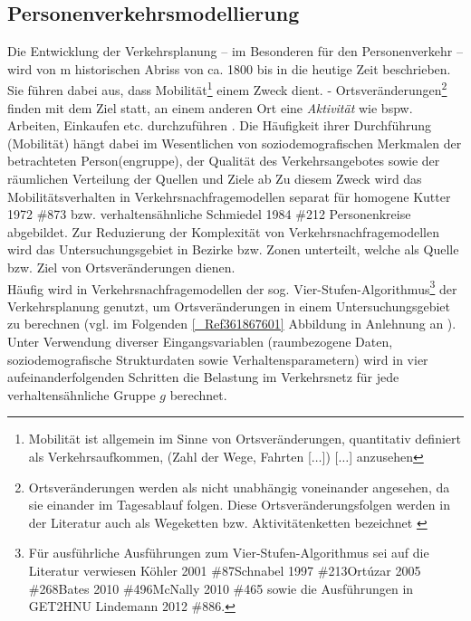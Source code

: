 % 
\subsection{Personenverkehrsmodellierung}
\label{_Ref364762824}
\label{_Toc365801592}
\label{_Toc366766082}
\label{_Toc366775276}
\label{_CTVC001a03b396d789f4a13bc4cb685af8db7c9}
Die Entwicklung der Verkehrsplanung – im Besonderen für den Personenverkehr – wird von  \citeauthor{bib.885} m historischen Abriss von ca. 1800 bis in die heutige Zeit beschrieben. Sie führen dabei aus, dass Mobilität\footnote{%
 Mobilität ist \glqq allgemein im Sinne von Ortsveränderungen, quantitativ definiert als Verkehrsaufkommen, (Zahl der Wege, Fahrten [$\ldots$]) [$\ldots$] anzusehen\grqq   \autocites[][]{bib.885}
}%
 einem Zweck dient. - Ortsveränderungen\footnote{%
 Ortsveränderungen werden als nicht unabhängig voneinander angesehen, da sie einander im Tagesablauf folgen. Diese Ortsveränderungsfolgen werden in der Literatur auch als Wegeketten bzw. Aktivitätenketten bezeichnet  \autocites[][]{bib.213}
}%
 finden mit dem Ziel statt, an einem anderen Ort eine \emph{Aktivität} wie bspw. Arbeiten, Einkaufen etc. durchzuführen  \autocites[vgl.][8ff]{bib.885}. Die Häufigkeit ihrer Durchführung (Mobilität) hängt dabei im Wesentlichen von soziodemografischen Merkmalen der betrachteten Person(engruppe), der Qualität des Verkehrsangebotes sowie der räumlichen Verteilung der Quellen und Ziele ab  \autocites[][]{bib.213} Zu diesem Zweck wird das Mobilitätsverhalten in Verkehrsnachfragemodellen separat für homogene {Kutter 1972 \#873} bzw. verhaltensähnliche {Schmiedel 1984 \#212} Personenkreise abgebildet. Zur Reduzierung der Komplexität von Verkehrsnachfragemodellen wird das Untersuchungsgebiet in Bezirke  \autocites[][]{bib.213} bzw. Zonen  \autocites[][]{bib.268} unterteilt, welche als Quelle bzw. Ziel von Ortsveränderungen dienen.~\\
Häufig wird in Verkehrsnachfragemodellen der sog. Vier-Stufen-Algorithmus\footnote{%
 Für ausführliche Ausführungen zum Vier-Stufen-Algorithmus sei auf die Literatur verwiesen {Köhler 2001 \#87}{Schnabel 1997 \#213}{Ortúzar 2005 \#268}{Bates 2010 \#496}{McNally 2010 \#465} sowie die Ausführungen in GET2HNU {Lindemann 2012 \#886}.
}%
 der Verkehrsplanung genutzt, um Ortsveränderungen in einem Untersuchungsgebiet zu berechnen (vgl. im Folgenden \autoref{_Ref361867601} Abbildung  in Anlehnung an  \autocites[][/nopar]{bib.87}). Unter Verwendung diverser Eingangsvariablen (raumbezogene Daten, soziodemografische Strukturdaten sowie Verhaltensparametern) wird in vier aufeinanderfolgenden Schritten die Belastung im Verkehrsnetz für jede verhaltensähnliche Gruppe $g$ berechnet.~\\

